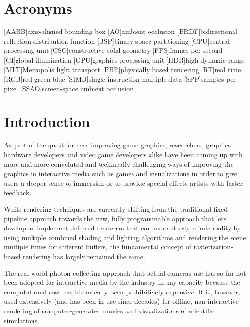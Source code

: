 \documentclass[
  twoside,
  11pt, a4paper,
  footinclude=true,
  headinclude=true,
  cleardoublepage=empty
]{scrreprt}
\begin{document}
\tableofcontents

\chapter*{Acronyms}
\begin{acronym}
    [AABB]{axis-aligned bounding box}
    [AO]{ambient occlusion}
    [BRDF]{bidirectional reflection distribution function}
    [BSP]{binary space partitioning}
    [CPU]{central processing unit}
    [CSG]{constructive solid geometry}
    [FPS]{frames per second}
    [GI]{global illumination}
    [GPU]{graphics processing unit}
    [HDR]{high dynamic range}
    [MLT]{Metropolis light transport}
    [PBR]{physically based rendering}
    [RT]{real time}
    [RGB]{red-green-blue}
    [SIMD]{single instruction multiple data}
    [SPP]{samples per pixel}
    [SSAO]{screen-space ambient occlusion}
\end{acronym}

\chapter{Introduction}
As part of the quest for ever-improving game graphics, researchers, graphics hardware developers
and video game developers alike have been coming up with more and more convoluted and technically
challenging ways of improving the graphics in interactive media such as games and visualizations in
order to give users a deeper sense of immersion or to provide special effects artists with faster
feedback.

While rendering techniques are currently shifting from the traditional fixed pipeline approach
towards the new, fully programmable approach that lets developers implement deferred renderers that
can more closely mimic reality by using multiple combined shading and lighting algorithms and
rendering the scene multiple times for different buffers, the fundamental concept of
rasterization-based rendering has largely remained the same.

The real world photon-collecting approach that actual cameras use has so far not been adopted for
interactive media by the industry in any capacity because the computational cost has historically
been prohibitively expensive. It is, however, used extensively (and has been in use since decades)
for offline, non-interactive rendering of computer-generated movies and visualizations of
scientific simulations.
\end{document}
